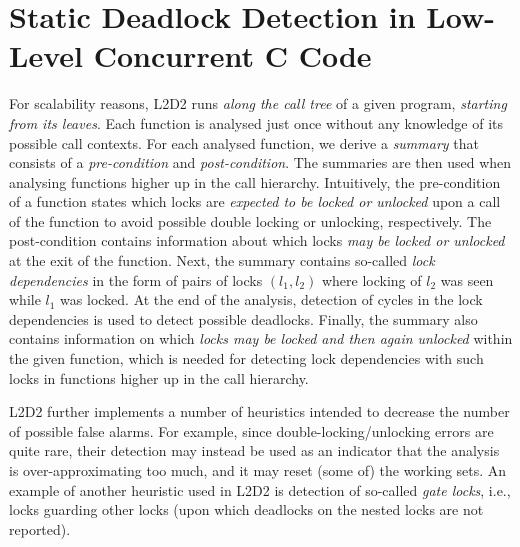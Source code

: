 \documentclass[runningheads]{llncs}
\begin{document}
\vspace*{-3.5mm}\section{Static Deadlock Detection in Low-Level Concurrent C
Code}\vspace*{-2mm}

For scalability reasons, L2D2 runs \emph{along the call tree} of a given
program, \emph{starting from its leaves}.
%
Each function is analysed just once without any knowledge of its possible call
contexts.
%
For each analysed function, we derive a \emph{summary} that consists of a
\emph{pre-condition} and \emph{post-condition}.
%
The summaries are then used when analysing functions higher up in the call
hierarchy.
%
%
%
Intuitively, the pre-condition of a function states which locks are
\emph{expected to be locked or unlocked} upon a call of the function to avoid
possible double locking or unlocking, respectively.
%
The post-condition contains information about which locks \emph{may be locked or
unlocked} at the exit of the function.
%
Next, the summary contains so-called \emph{lock dependencies} in the form of
pairs of locks $(l_1,l_2)$ where locking of $l_2$ was seen while $l_1$ was
locked.
%
At the end of the analysis, detection of cycles in the lock dependencies is used
to detect possible deadlocks.
%
Finally, the summary also contains information on which \emph{locks may be
locked and then again unlocked} within the given function, which is needed for
detecting lock dependencies with such locks in functions higher up in the call
hierarchy.

L2D2 further implements a number of heuristics intended to decrease the number
of possible false alarms.
%
For example, since double-locking/unlocking errors are quite rare, their
detection may instead be used as an indicator that the analysis is
over-approximating too much, and it may reset (some of) the working sets.
%
An example of another heuristic used in L2D2 is detection of so-called
\emph{gate locks}, i.e., locks guarding other locks (upon which deadlocks on the
nested locks are not reported).
\end{document}
